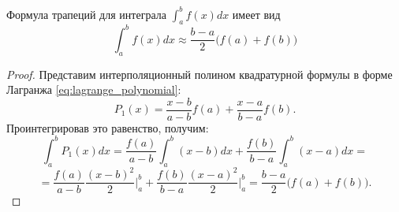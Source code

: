\documentclass[../main.tex]{subfile}
\begin{document}
\begin{theorem}\label{eq:trapezoidal_rule}
	Формула трапеций для интеграла $\int_a^b f(x)dx$ имеет
	вид
	\[\boxed{\int_a^b f(x)dx\approx\frac{b-a}{2}\big(f(a)+f(b)\big)}\]
\end{theorem}
\newpage

\begin{proof}
	Представим интерполяционный полином квадратурной формулы в форме
	Лагранжа \eqref{eq:lagrange_polynomial}:
	\[P_1(x)=\frac{x-b}{a-b}f(a)+\frac{x-a}{b-a}f(b).\]
	Проинтегрировав это равенство, получим:
	\[\int_a^b P_1(x)dx=\frac{f(a)}{a-b}\int_a^b (x-b)dx +
	\frac{f(b)}{b-a}\int_a^b (x-a)dx=\]
	\[=\frac{f(a)}{a-b}\frac{(x-b)^2}{2}\Big|_a^b+\frac{f(b)}{b-a}
	\frac{(x-a)^2}{2}\Big|_a^b=\frac{b-a}{2}\big(f(a)+f(b)\big).\]
\end{proof}
\end{document}
